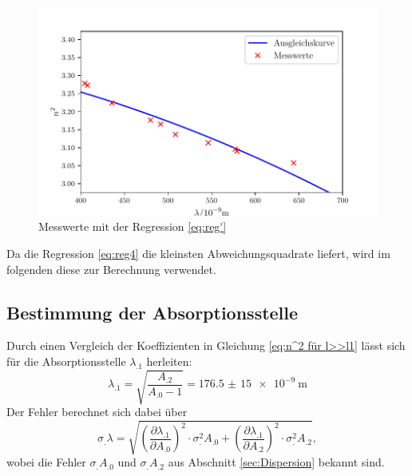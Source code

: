 \begin{figure}
\centering
\includegraphics[scale=0.5]{content/images/Graph11a.pdf}
\caption{Messwerte mit der Regression \eqref{eq:reg'}}
\label{fig:reg'}
\end{figure}
\noindent Da die Regression \eqref{eq:reg4} die kleinsten Abweichungsquadrate liefert, wird im folgenden diese zur Berechnung verwendet.


\subsection{Bestimmung der Absorptionsstelle}

Durch einen Vergleich der Koeffizienten in Gleichung \eqref{eq:n^2 für l>>l1} lässt sich für die Absorptionsstelle $\lambda_.1$ herleiten:
\[
\lambda_.1 = \sqrt{\frac{A_.2}{A_.0-1}}=\SI{176,5(15)e-9}{\metre}
\]
Der Fehler berechnet sich dabei über
\[
\sigma_.{\lambda} =\sqrt{\left(\frac{\partial \lambda_.1}{\partial A_.0}\right)^2\cdot\sigma^2_.{A_.0}+\left(\frac{\partial\lambda_.1}{\partial A_.2}\right)^2\cdot\sigma^2_.{A_.2}},
\]
wobei die Fehler $\sigma_.{A_.0}$ und $\sigma_.{A_.2}$ aus Abschnitt \ref{sec:Dispersion} bekannt sind.

